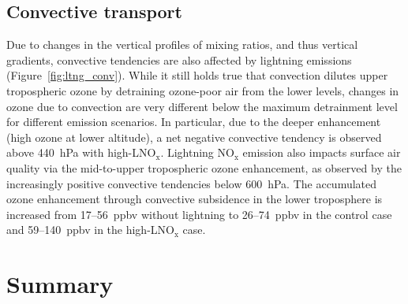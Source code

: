 \subsection{Convective transport}

Due to changes in the vertical profiles of mixing ratios, and thus
vertical gradients, convective tendencies are also affected by lightning
emissions (Figure~\ref{fig:ltng_conv}). While it still holds true that convection
dilutes upper tropospheric ozone by detraining ozone-poor air from the
lower levels, changes in ozone due to convection are very different below
the maximum detrainment level for different emission scenarios. In
particular, due to the deeper enhancement (high ozone at lower altitude),
a net negative convective tendency is observed above 440~hPa with
high-LNO$_\mathrm{x}$. Lightning $\mathrm{NO_x}$ emission also impacts surface air quality
via the mid-to-upper tropospheric ozone enhancement, as observed by
the increasingly positive convective tendencies below 600~hPa. The accumulated
ozone enhancement through convective subsidence in the lower troposphere
is increased from 17--56~ppbv without lightning to 26--74~ppbv in the
control case and 59--140~ppbv in the high-LNO$_{\mathrm{x}}$ case.

\section{Summary}\label{sect:summary}

